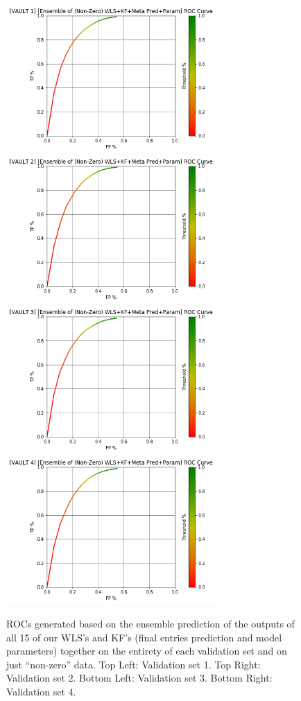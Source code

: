 \begin{figure}[h]
\centering
\includegraphics[width=8cm]{body/results/Graphs/Meta+Series/Non-Zero/v1.png}
\includegraphics[width=8cm]{body/results/Graphs/Meta+Series/Non-Zero/v2.png}
\includegraphics[width=8cm]{body/results/Graphs/Meta+Series/Non-Zero/v3.png}
\includegraphics[width=8cm]{body/results/Graphs/Meta+Series/Non-Zero/v4.png}
\caption{ROCs generated based on the ensemble prediction of the outputs of all 15 of our WLS's and KF's (final entries prediction and model parameters) together on the entirety of each validation set and on just ``non-zero'' data. Top Left: Validation set 1. Top Right: Validation set 2. Bottom Left: Validation set 3. Bottom Right: Validation set 4.}
\label{fig:MetSern0}
\end{figure}

